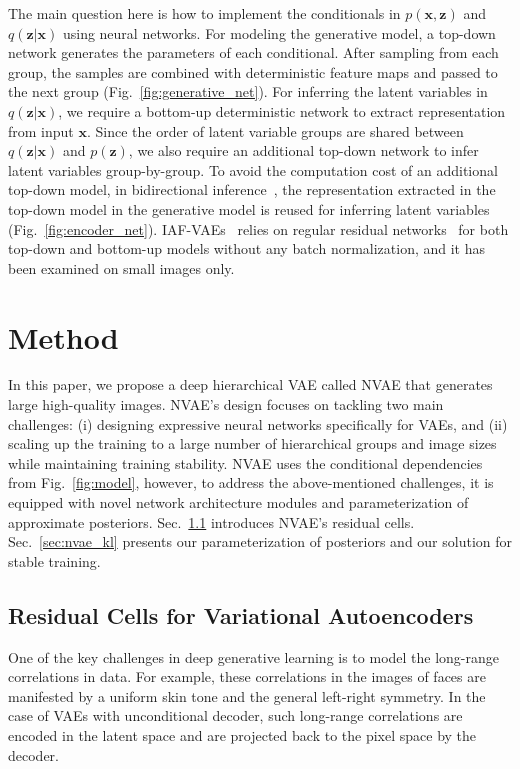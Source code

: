 \documentclass{article}
\newcommand{\x}{{\pmb{x}}}
\newcommand{\z}{{\pmb{z}}}
\begin{document}
The main question here is how to implement the conditionals in $p(\x, \z)$ and $q(\z|\x)$ using neural networks. For modeling the generative model, a top-down network generates the parameters of each conditional. After sampling from each group, the samples are combined with deterministic feature maps and passed to the next group (Fig.~\ref{fig:generative_net}). For inferring the latent variables in $q(\z|\x)$, we require a bottom-up deterministic network to extract representation from input $\x$. Since the order of latent variable groups are shared between $q(\z|\x)$ and $p(\z)$, we also require an additional top-down network to infer latent variables group-by-group. To avoid the computation cost of an additional top-down model, in bidirectional inference~\cite{kingma2016improved}, the representation extracted in the top-down model in the generative model is reused for inferring latent variables (Fig.~\ref{fig:encoder_net}). IAF-VAEs~\cite{kingma2016improved} relies on regular residual networks~\cite{he2016deep} for both top-down and bottom-up models without any batch normalization, and it has been examined on small images only.



 \section{Method}\label{sec:method}
In this paper, we propose a deep hierarchical VAE called NVAE that generates large high-quality images. NVAE's design focuses on tackling two main challenges: (i) designing expressive neural networks specifically for VAEs, and (ii) scaling up the training to a large number of hierarchical groups and image sizes while maintaining training stability. NVAE uses the conditional dependencies from Fig.~\ref{fig:model}, however, to address the above-mentioned challenges, it is equipped with novel network architecture modules and parameterization of approximate posteriors. Sec.~\ref{sec:nvae_net} introduces NVAE's residual cells. Sec.~\ref{sec:nvae_kl} presents our parameterization of posteriors and our solution for stable training.


\subsection{Residual Cells for Variational Autoencoders}\label{sec:nvae_net}
One of the key challenges in deep generative learning is to model the long-range correlations in data. For example, these correlations in the images of faces are manifested by a uniform skin tone and the general left-right symmetry. In the case of VAEs with unconditional decoder, such long-range correlations are encoded in the latent space and are projected back to the pixel space by the decoder. 
\end{document}
